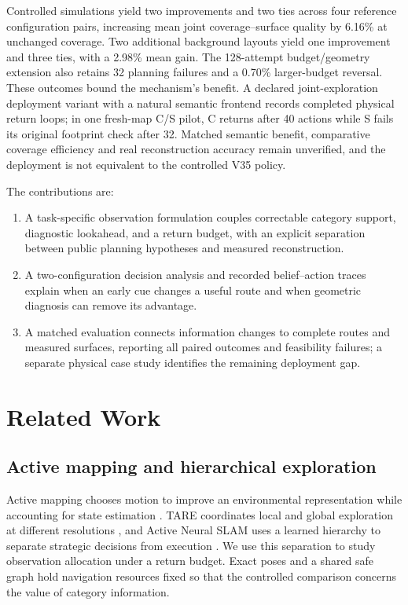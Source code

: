 \documentclass[11pt,a4paper]{article}
\providecommand{\hypertarget}[2]{#2}
\providecommand{\tightlist}{\setlength{\itemsep}{0pt}\setlength{\parskip}{0pt}}
\begin{document}
Controlled simulations yield two improvements and two ties across four reference configuration pairs, increasing mean joint coverage--surface quality by 6.16\% at unchanged coverage. Two additional background layouts yield one improvement and three ties, with a 2.98\% mean gain. The 128-attempt budget/geometry extension also retains 32 planning failures and a 0.70\% larger-budget reversal. These outcomes bound the mechanism's benefit. A declared joint-exploration deployment variant with a natural semantic frontend records completed physical return loops; in one fresh-map C/S pilot, C returns after 40 actions while S fails its original footprint check after 32. Matched semantic benefit, comparative coverage efficiency and real reconstruction accuracy remain unverified, and the deployment is not equivalent to the controlled V35 policy.

The contributions are:

\begin{enumerate}
\def\labelenumi{\arabic{enumi}.}
\tightlist
\item
  A task-specific observation formulation couples correctable category support, diagnostic lookahead, and a return budget, with an explicit separation between public planning hypotheses and measured reconstruction.
\item
  A two-configuration decision analysis and recorded belief--action traces explain when an early cue changes a useful route and when geometric diagnosis can remove its advantage.
\item
  A matched evaluation connects information changes to complete routes and measured surfaces, reporting all paired outcomes and feasibility failures; a separate physical case study identifies the remaining deployment gap.
\end{enumerate}

\hypertarget{related-work}{%
\section{Related Work}\label{related-work}}

\hypertarget{active-mapping-and-hierarchical-exploration}{%
\subsection{Active mapping and hierarchical exploration}\label{active-mapping-and-hierarchical-exploration}}

Active mapping chooses motion to improve an environmental representation while accounting for state estimation \cite{ref10}. TARE coordinates local and global exploration at different resolutions \cite{ref5}, and Active Neural SLAM uses a learned hierarchy to separate strategic decisions from execution \cite{ref1}. We use this separation to study observation allocation under a return budget. Exact poses and a shared safe graph hold navigation resources fixed so that the controlled comparison concerns the value of category information.
\end{document}
